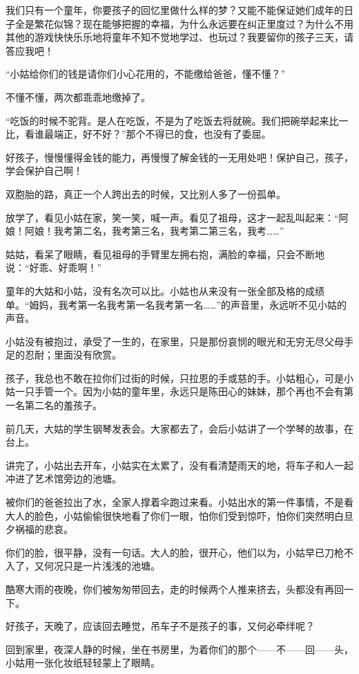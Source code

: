 \par 我们只有一个童年，你要孩子的回忆里做什么样的梦？又能不能保证她们成年的日子全是繁花似锦？现在能够把握的幸福，为什么永远要在纠正里度过？为什么不用其他的游戏快快乐乐地将童年不知不觉地学过、也玩过？我要留你的孩子三天，请答应我吧！
\par “小姑给你们的钱是请你们小心花用的，不能缴给爸爸，懂不懂？”
\par 不懂不懂，两次都乖乖地缴掉了。
\par “吃饭的时候不驼背。是人在吃饭，不是为了吃饭去将就碗。我们把碗举起来比一比，看谁最端正，好不好？”那个不得已的食，也没有了委屈。
\par 好孩子，慢慢懂得金钱的能力，再慢慢了解金钱的一无用处吧！保护自己，孩子，学会保护自己啊！
\par 双胞胎的路，真正一个人跨出去的时候，又比别人多了一份孤单。
\par 放学了，看见小姑在家，笑一笑，喊一声。看见了祖母，这才一起乱叫起来：“阿娘！阿娘！我考第二名，我考第三名，我考第二第三名，我考……”
\par 姑姑，看呆了眼睛，看见祖母的手臂里左拥右抱，满脸的幸福，只会不断地说：“好乖、好乖啊！”
\par 童年的大姑和小姑，没有名次可以比。小姑也从来没有一张全部及格的成绩单。“姆妈，我考第一名我考第一名我考第一名……”的声音里，永远听不见小姑的声音。
\par 小姑没有被抱过，承受了一生的，在家里，只是那份哀悯的眼光和无穷无尽父母手足的忍耐；里面没有欣赏。
\par 孩子，我总也不敢在拉你们过街的时候，只拉恩的手或慈的手。小姑粗心，可是小姑一只手管一个。因为小姑的童年里，永远只是陈田心的妹妹，那个再也不会有第一名第二名的羞孩子。
\par 前几天，大姑的学生钢琴发表会。大家都去了，会后小姑讲了一个学琴的故事，在台上。
\par 讲完了，小姑出去开车，小姑实在太累了，没有看清楚雨天的地，将车子和人一起冲进了艺术馆旁边的池塘。
\par 被你们的爸爸拉出了水，全家人撑着伞跑过来看。小姑出水的第一件事情，不是看大人的脸色，小姑偷偷很快地看了你们一眼，怕你们受到惊吓，怕你们突然明白旦夕祸福的悲哀。
\par 你们的脸，很平静，没有一句话。大人的脸，很开心，他们以为，小姑早已刀枪不入了，又何况只是一片浅浅的池塘。
\par 酷寒大雨的夜晚，你们被匆匆带回去，走的时候两个人推来挤去，头都没有再回一下。
\par 好孩子，天晚了，应该回去睡觉，吊车子不是孩子的事，又何必牵绊呢？
\par 回到家里，夜深人静的时候，坐在书房里，为着你们的那个——不——回——头，小姑用一张化妆纸轻轻蒙上了眼睛。
